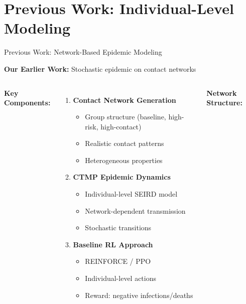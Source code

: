 \documentclass[aspectratio=169]{beamer}
\begin{document}
\section{Previous Work: Individual-Level Modeling}

\begin{frame}{Previous Work: Network-Based Epidemic Modeling}

\textbf{Our Earlier Work:} Stochastic epidemic on contact networks

\begin{columns}

\textbf{Key Components:}
\begin{enumerate}
    \item \textbf{Contact Network Generation}
    \begin{itemize}
        \item Group structure (baseline, high-risk, high-contact)
        \item Realistic contact patterns
        \item Heterogeneous properties
    \end{itemize}

    \item \textbf{CTMP Epidemic Dynamics}
    \begin{itemize}
        \item Individual-level SEIRD model
        \item Network-dependent transmission
        \item Stochastic transitions
    \end{itemize}

    \item \textbf{Baseline RL Approach}
    \begin{itemize}
        \item REINFORCE / PPO
        \item Individual-level actions
        \item Reward: negative infections/deaths
    \end{itemize}
\end{enumerate}

\centering
\textbf{Network Structure:}

\end{columns}
\end{frame}
\end{document}
